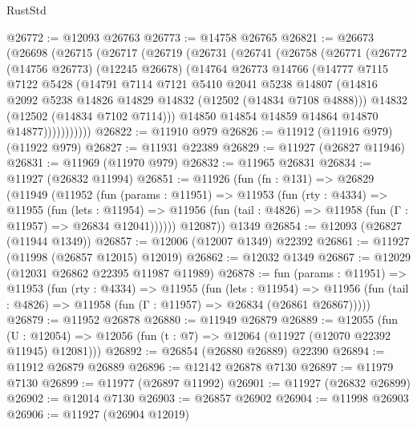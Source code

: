 \begin{lexlean}{RustStd}
\begin{coremodule}
@26772 := @12093 @26763
@26773 := @14758 @26765
@26821 := @26673
    (@26698
      (@26715
        (@26717
          (@26719
            (@26731
              (@26741
                (@26758
                  (@26771
                    (@26772
                      (@14756 @26773)
                      (@12245 @26678)
                      (@14764
                        @26773
                        @14766
                        (@14777
                          @7115
                          @7122
                          @5428
                          (@14791
                            @7114
                            @7121
                            @5410
                            @2041
                            @5238
                            @14807
                            (@14816 @2092 @5238 @14826 @14829 @14832 (@12502 (@14834 @7108 @4888)))
                            @14832
                            (@12502 (@14834 @7102 @7114)))
                          @14850
                          @14854
                          @14859
                          @14864
                          @14870
                          @14877)))))))))))
@26822 := @11910 @979
@26826 := @11912 (@11916 @979) (@11922 @979)
@26827 := @11931 @22389
@26829 := @11927 (@26827 @11946)
@26831 := @11969 (@11970 @979)
@26832 := @11965 @26831
@26834 := @11927 (@26832 @11994)
@26851 := @11926
    (fun (fn : @131) =>
    @26829
      (@11949
        (@11952
          (fun (params : @11951) =>
          @11953
            (fun (rty : @4334) =>
            @11955
              (fun (lets : @11954) =>
              @11956 (fun (tail : @4826) => @11958 (fun (Γ : @11957) => @26834 @12041))))))
        @12087))
    @1349
@26854 := @12093 (@26827 (@11944 @1349))
@26857 := @12006 (@12007 @1349) @22392
@26861 := @11927 (@11998 (@26857 @12015) @12019)
@26862 := @12032 @1349
@26867 := @12029 (@12031 @26862 @22395 @11987 @11989)
@26878 := fun (params : @11951) =>
  @11953
    (fun (rty : @4334) =>
    @11955
      (fun (lets : @11954) =>
      @11956 (fun (tail : @4826) => @11958 (fun (Γ : @11957) => @26834 (@26861 @26867)))))
@26879 := @11952 @26878
@26880 := @11949 @26879
@26889 := @12055
    (fun (U : @12054) => @12056 (fun (t : @7) => @12064 (@11927 (@12070 @22392 @11945) @12081)))
@26892 := @26854 (@26880 @26889) @22390
@26894 := @11912 @26879 @26889
@26896 := @12142 @26878 @7130
@26897 := @11979 @7130
@26899 := @11977 (@26897 @11992)
@26901 := @11927 (@26832 @26899)
@26902 := @12014 @7130
@26903 := @26857 @26902
@26904 := @11998 @26903
@26906 := @11927 (@26904 @12019)

\end{coremodule}
\end{lexlean}
